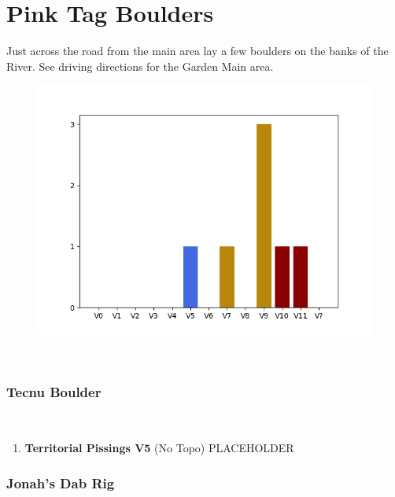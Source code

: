 \chapter{Pink Tag Boulders}\label{a:Pink Tag Boulders}
\lhead{\textcolor{\chapterColor}{\rule[-2pt]{\textwidth}{15pt}}}
Just across the road from the main area lay a few boulders on the banks of the River. See driving directions for the Garden Main area.
\begin{figure}[h]
  \centering
    \includegraphics[width=\linewidth]{./maps/plots/Pink Tag Boulders.png}
\end{figure}

\
\subsection*{Tecnu Boulder}\label{bf:Tecnu Boulder}
\

\begin{enumerate}[]
	\setcounter{enumi}{0}
	\item\label{rt:Territorial Pissings} \colorbox{RoyalBlue!20}{\textbf{Territorial Pissings V5  } }
	\newline (No Topo) 
	\newline PLACEHOLDER\
\end{enumerate}
\subsection*{Jonah's Dab Rig}\label{bf:Jonah's Dab Rig}
\

